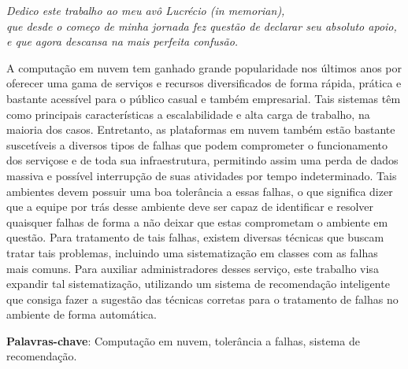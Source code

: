 \documentclass[
	12pt,				%
	oneside,			%
	a4paper,			%
	chapter=TITLE,		%
	english,			%
	french,				%
	spanish,			%
	brazil				%
	]{abntex2}
\begin{document}

\begin{dedicatoria}
   \vspace*{\fill}
   \centering
   \noindent
   \textit{Dedico este trabalho ao meu avô Lucrécio (in memorian), \\ que desde o começo de minha jornada fez questão de declarar seu absoluto apoio, \\ e que agora descansa na mais perfeita confusão.} \vspace*{\fill}
\end{dedicatoria}

%
%



\setlength{\absparsep}{18pt} %
\begin{resumo}
 A computação em nuvem tem ganhado grande popularidade nos últimos anos por oferecer uma gama de serviços e recursos diversificados de forma rápida, prática e bastante acessível para o público casual e também empresarial. Tais sistemas têm como principais características a escalabilidade e alta carga de trabalho, na maioria dos casos. Entretanto, as plataformas em nuvem também estão bastante suscetíveis a diversos tipos de falhas que podem comprometer o funcionamento dos serviçose e de toda sua infraestrutura, permitindo assim uma perda de dados massiva e possível interrupção de suas atividades por tempo indeterminado. Tais ambientes devem possuir uma boa tolerância a essas falhas, o que significa dizer que a equipe por trás desse ambiente deve ser capaz de identificar e resolver quaisquer falhas de forma a não deixar que estas comprometam o ambiente em questão. Para tratamento de tais falhas, existem diversas técnicas que buscam tratar tais problemas, incluindo uma sistematização em classes com as falhas mais comuns. Para auxiliar administradores desses serviço, este trabalho visa expandir tal sistematização, utilizando um sistema de recomendação inteligente que consiga fazer a sugestão das técnicas corretas para o tratamento de falhas no ambiente de forma automática.

 \textbf{Palavras-chave}: Computação em nuvem, tolerância a falhas, sistema de recomendação.
\end{resumo}
\end{document}
